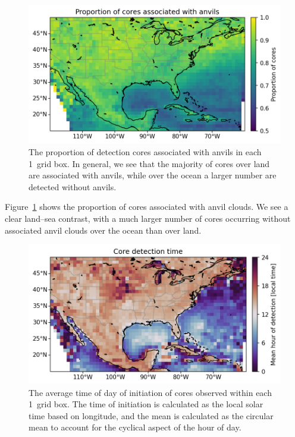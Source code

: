 \begin{figure}[tp]
    \centering
    \includegraphics[width=\textwidth]{figures/ch2_04.png}
    \caption[
    The proportion of detection cores associated with anvils
    ]{
    The proportion of detection cores associated with anvils in each 1\textdegree\ grid box. In general, we see that the majority of cores over land are associated with anvils, while over the ocean a larger number are detected without anvils.
    }
    \label{fig:cores_with_anvils_map}
\end{figure}

Figure~\ref{fig:cores_with_anvils_map} shows the proportion of cores associated with anvil clouds.
We see a clear land--sea contrast, with a much larger number of cores occurring without associated anvil clouds over the ocean than over land.

\begin{figure}[tp]
    \centering
    \includegraphics[width=\textwidth]{figures/ch2_05.png}
    \caption[
    The average time of initiation of observed cores
    ]{
    The average time of day of initiation of cores observed within each 1\textdegree\ grid box. The time of initiation is calculated as the local solar time based on longitude, and the mean is calculated as the circular mean to account for the cyclical aspect of the hour of day.
    }
    \label{fig:core_detection_time_map}
\end{figure}

